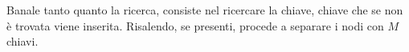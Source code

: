 \documentclass{subfiles}
\begin{document}
Banale tanto quanto la ricerca, consiste nel ricercare la chiave, chiave che se non è trovata viene inserita.
Risalendo, se presenti, procede a separare i nodi con \(M\) chiavi.
\end{document}
